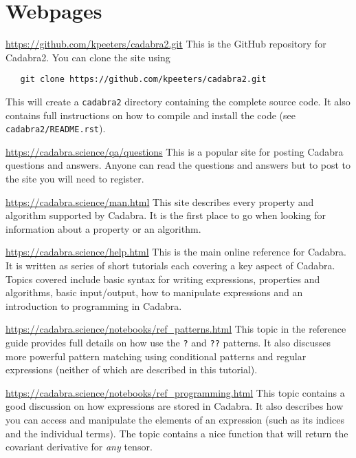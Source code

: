 \documentclass[a4paper,12pt]{article}
\numberwithin{equation}{section}%
\begin{document}
\lstset{numbers=none}

\clearpage

\section*{Webpages}

\url{https://github.com/kpeeters/cadabra2.git}\Break
This is the GitHub repository for Cadabra2. You can clone the site using
\begin{lstlisting}
   git clone https://github.com/kpeeters/cadabra2.git
\end{lstlisting}
This will create a \verb|cadabra2| directory containing the complete source code. It also
contains full instructions on how to compile and install the code (see
\verb|cadabra2/README.rst|).

\url{https://cadabra.science/qa/questions}\Break
This is a popular site for posting Cadabra questions and answers. Anyone can read the
questions and answers but to post to the site you will need to register.

\url{https://cadabra.science/man.html}\Break
This site describes every property and algorithm supported by Cadabra. It is the
first place to go when looking for information about a property or an algorithm.

\url{https://cadabra.science/help.html}\Break
This is the main online reference for Cadabra. It is written as series of short tutorials
each covering a key aspect of Cadabra. Topics covered include basic syntax for writing
expressions, properties and algorithms, basic input/output, how to manipulate expressions and
an introduction to programming in Cadabra.

\url{https://cadabra.science/notebooks/ref_patterns.html}\Break
This topic in the reference guide provides full details on how use the \verb|?| and
\verb|??| patterns. It also discusses more powerful pattern matching using conditional
patterns and regular expressions (neither of which are described in this tutorial).

\url{https://cadabra.science/notebooks/ref_programming.html}\Break
This topic contains a good discussion on how expressions are stored in Cadabra. It also
describes how you can access and manipulate the elements of an expression (such as its
indices and the individual terms). The topic contains a nice function that will return the
covariant derivative for \emph{any} tensor.
\end{document}

